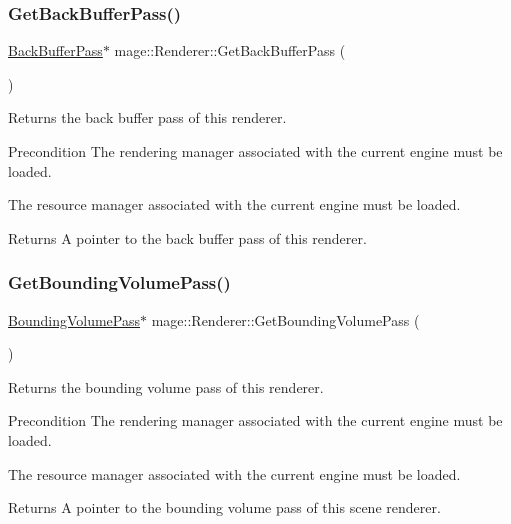 \subsubsection{\texorpdfstring{Get\+Back\+Buffer\+Pass()}{GetBackBufferPass()}}
{\footnotesize\ttfamily \hyperlink{classmage_1_1_back_buffer_pass}{Back\+Buffer\+Pass}$\ast$ mage\+::\+Renderer\+::\+Get\+Back\+Buffer\+Pass (\begin{DoxyParamCaption}{ }\end{DoxyParamCaption})}

Returns the back buffer pass of this renderer.

\begin{DoxyPrecond}{Precondition}
The rendering manager associated with the current engine must be loaded. 

The resource manager associated with the current engine must be loaded. 
\end{DoxyPrecond}
\begin{DoxyReturn}{Returns}
A pointer to the back buffer pass of this renderer. 
\end{DoxyReturn}
\hypertarget{classmage_1_1_renderer_a770922853ea48d3f01be5518df8aadb5}{}\label{classmage_1_1_renderer_a770922853ea48d3f01be5518df8aadb5} 
\subsubsection{\texorpdfstring{Get\+Bounding\+Volume\+Pass()}{GetBoundingVolumePass()}}
{\footnotesize\ttfamily \hyperlink{classmage_1_1_bounding_volume_pass}{Bounding\+Volume\+Pass}$\ast$ mage\+::\+Renderer\+::\+Get\+Bounding\+Volume\+Pass (\begin{DoxyParamCaption}{ }\end{DoxyParamCaption})}

Returns the bounding volume pass of this renderer.

\begin{DoxyPrecond}{Precondition}
The rendering manager associated with the current engine must be loaded. 

The resource manager associated with the current engine must be loaded. 
\end{DoxyPrecond}
\begin{DoxyReturn}{Returns}
A pointer to the bounding volume pass of this scene renderer. 
\end{DoxyReturn}
\hypertarget{classmage_1_1_renderer_ae0299628a5475fb8587186a4cacc6a75}{}\label{classmage_1_1_renderer_ae0299628a5475fb8587186a4cacc6a75} 
